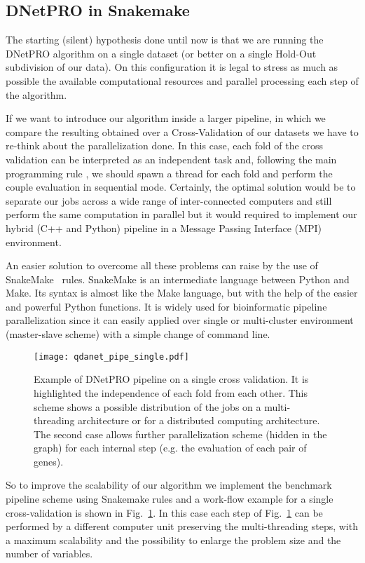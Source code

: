 \documentclass{standalone}
\begin{document}
\subsection[Pipeline]{DNetPRO in Snakemake}\label{implementation:snakemake}

The starting (silent) hypothesis done until now is that we are running the \textsf{DNetPRO} algorithm on a single dataset (or better on a single Hold-Out subdivision of our data).
On this configuration it is legal to stress as much as possible the available computational resources and parallel processing each step of the algorithm.

If we want to introduce our algorithm inside a larger pipeline, in which we compare the resulting obtained over a Cross-Validation of our datasets we have to re-think about the parallelization done.
In this case, each fold of the cross validation can be interpreted as an independent task and, following the main programming rule \emph{}, we should spawn a thread for each fold and perform the couple evaluation in sequential mode.
Certainly, the optimal solution would be to separate our jobs across a wide range of inter-connected computers and still perform the same computation in parallel but it would required to implement our hybrid (\textsf{C++} and \textsf{Python}) pipeline in a Message Passing Interface (MPI) environment.

An easier solution to overcome all these problems can raise by the use of \textsf{SnakeMake}~\cite{snakemake} rules.
\textsf{SnakeMake} is an intermediate language between \textsf{Python} and \textsf{Make}.
Its syntax is almost like the \textsf{Make} language, but with the help of the easier and powerful \textsf{Python} functions.
It is widely used for bioinformatic pipeline parallelization since it can easily applied over single or multi-cluster environment (master-slave scheme) with a simple change of command line.

\begin{center}
\begin{figure}[htbp]
\hspace{-2cm}
\texttt{[image: qdanet\_pipe\_single.pdf]}
\caption{Example of \textsf{DNetPRO} pipeline on a single cross validation.
It is highlighted the independence of each fold from each other.
This scheme shows a possible distribution of the jobs on a multi-threading architecture or for a distributed computing architecture.
The second case allows further parallelization scheme (hidden in the graph) for each internal step (e.g. the evaluation of each pair of genes).
}
\label{fig:dnet_workflow}
\end{figure}
\end{center}

So to improve the scalability of our algorithm we implement the benchmark pipeline scheme using Snakemake rules and a work-flow example for a single cross-validation is shown in Fig.~\ref{fig:dnet_workflow}.
In this case each step of Fig.~\ref{fig:dnet_workflow} can be performed by a different computer unit preserving the multi-threading steps, with a maximum scalability and the possibility to enlarge the problem size and the number of variables.
\end{document}
